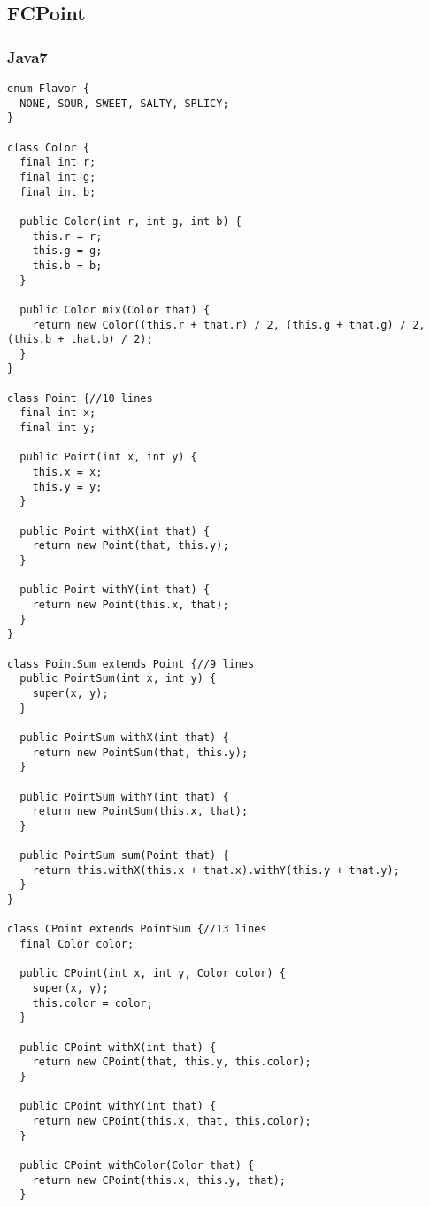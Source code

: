 \subsection{FCPoint}
\subsubsection{Java7}

\begin{lstlisting}
enum Flavor {
  NONE, SOUR, SWEET, SALTY, SPLICY;
}

class Color {
  final int r;
  final int g;
  final int b;

  public Color(int r, int g, int b) {
    this.r = r;
    this.g = g;
    this.b = b;
  }

  public Color mix(Color that) {
    return new Color((this.r + that.r) / 2, (this.g + that.g) / 2, (this.b + that.b) / 2);
  }
}

class Point {//10 lines
  final int x;
  final int y;

  public Point(int x, int y) {
    this.x = x;
    this.y = y;
  }

  public Point withX(int that) {
    return new Point(that, this.y);
  }

  public Point withY(int that) {
    return new Point(this.x, that);
  }
}

class PointSum extends Point {//9 lines
  public PointSum(int x, int y) {
    super(x, y);
  }

  public PointSum withX(int that) {
    return new PointSum(that, this.y);
  }

  public PointSum withY(int that) {
    return new PointSum(this.x, that);
  }

  public PointSum sum(Point that) {
    return this.withX(this.x + that.x).withY(this.y + that.y);
  }
}

class CPoint extends PointSum {//13 lines
  final Color color;

  public CPoint(int x, int y, Color color) {
    super(x, y);
    this.color = color;
  }

  public CPoint withX(int that) {
    return new CPoint(that, this.y, this.color);
  }

  public CPoint withY(int that) {
    return new CPoint(this.x, that, this.color);
  }

  public CPoint withColor(Color that) {
    return new CPoint(this.x, this.y, that);
  }


\end{lstlisting}
